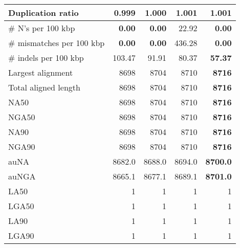\documentclass[12pt,a4paper]{article}
\begin{document}
\begin{table}[ht]
\begin{center}
\begin{tabular}{|l*{4}{|r}|}
Duplication ratio & {\bf 0.999} & 1.000 & 1.001 & 1.001 \\ \hline
\# N's per 100 kbp & {\bf 0.00} & {\bf 0.00} & 22.92 & {\bf 0.00} \\ \hline
\# mismatches per 100 kbp & {\bf 0.00} & {\bf 0.00} & 436.28 & {\bf 0.00} \\ \hline
\# indels per 100 kbp & 103.47 & 91.91 & 80.37 & {\bf 57.37} \\ \hline
Largest alignment & 8698 & 8704 & 8710 & {\bf 8716} \\ \hline
Total aligned length & 8698 & 8704 & 8710 & {\bf 8716} \\ \hline
NA50 & 8698 & 8704 & 8710 & {\bf 8716} \\ \hline
NGA50 & 8698 & 8704 & 8710 & {\bf 8716} \\ \hline
NA90 & 8698 & 8704 & 8710 & {\bf 8716} \\ \hline
NGA90 & 8698 & 8704 & 8710 & {\bf 8716} \\ \hline
auNA & 8682.0 & 8688.0 & 8694.0 & {\bf 8700.0} \\ \hline
auNGA & 8665.1 & 8677.1 & 8689.1 & {\bf 8701.0} \\ \hline
LA50 & 1 & 1 & 1 & 1 \\ \hline
LGA50 & 1 & 1 & 1 & 1 \\ \hline
LA90 & 1 & 1 & 1 & 1 \\ \hline
LGA90 & 1 & 1 & 1 & 1 \\ \hline
\end{tabular}
\end{center}
\end{table}
\end{document}
